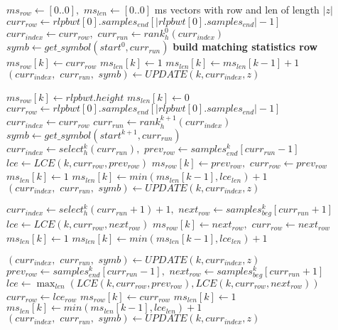 \documentclass[a4paper,12pt, oneside]{book}
\begin{document}
\begin{algorithm}
  \scriptsize
  \begin{algorithmic}[1]
    \State $ms_{row}\gets [0..0],\,\,ms_{len}\gets [0..0]$
    \Comment ms vectors with row and len of length $|z|$
    \State $curr_{row}\gets
    rlpbwt[0].samples_{end}[|rlpbwt[0].samples_{end}|-1]$
    \State $curr_{index}\gets curr_{row},\,\,curr_{run}\gets
    rank_h^0(curr_{index})$ 
    \State $symb\gets get\_symbol(start^0, curr_{run})$
    \Comment \textbf{build matching statistics row}
    \For {\textit{every} $k\in[0, |z|)$}
    \State $ms_{row}[k]\gets curr_{row}$
    \State $ms_{len}[k] \gets 1$
    \Else
    \State $ms_{len}[k] \gets ms_{len}[k-1]+1$
    \EndIf
     \State $(curr_{index},\,\,curr_{run},\,\,symb)\gets UPDATE(k, curr_{index},
    z)$ 
    \EndIf
    \Else
    
    \State $ms_{row}[k]\gets rlpbwt.height$
    \State $ms_{len}[k]\gets 0$
    \State $curr_{row}\gets
    rlpbwt[0].samples_{end}[|rlpbwt[0].samples_{end}|-1]$
    \State $curr_{index}\gets curr_{row}$
    \State $curr_{run}\gets rank_h^{k+1}(curr_{index})$
    \State $symb\gets get\_symbol(start^{k+1}, curr_{run})$
    \EndIf
    \Else
    \State $curr_{index}\gets select_h^k(curr_{run}),\,\,prev_{row}\gets
    samples_{end}^k[curr_{run}-1]$ 
    \State $lce\gets LCE(k, curr_{row}, prev_{row})$
    \State $ms_{row}[k]\gets prev_{row},\,\,curr_{row}\gets prev_{row}$
    \State $ms_{len}[k] \gets 1$
    \Else
    \State $ms_{len}[k] \gets min(ms_{len}[k-1], lce_{len})+1$
    \EndIf
    \State $(curr_{index},\,\,curr_{run},\,\,symb)\gets UPDATE(k, curr_{index},
    z)$  
    \EndIf
    
    \State $curr_{index}\gets select_h^k(curr_{run}+1)+1,\,\,next_{row}\gets
    samples_{beg}^k[curr_{run}+1]$ 
    \State $lce\gets LCE(k, curr_{row}, next_{row})$
    \State $ms_{row}[k]\gets next_{row},\,\,curr_{row}\gets next_{row}$
    \State $ms_{len}[k] \gets 1$
    \Else
    \State $ms_{len}[k] \gets min(ms_{len}[k-1], lce_{len})+1$
    \EndIf
  
    \State $(curr_{index},\,\,curr_{run},\,\,symb)\gets UPDATE(k, curr_{index},
    z)$ 
    \EndIf
    \Else
    \State $prev_{row}\gets samples_{end}^k[curr_{run}-1],\,\,next_{row}\gets
    samples_{beg}^k[curr_{run}+1]$ 
    \State $lce\gets \max_{len} (LCE(k, curr_{row}, prev_{row}), LCE(k,
    curr_{row}, next_{row}))$
    \State $curr_{row}\gets lce_{row}$
    \State $ms_{row}[k]\gets curr_{row}$
    \State $ms_{len}[k] \gets 1$
    \Else
    \State $ms_{len}[k] \gets min(ms_{len}[k-1], lce_{len})+1$
    \EndIf
    \State $(curr_{index},\,\,curr_{run},\,\,symb)\gets UPDATE(k, curr_{index},
    z)$ 
    \EndIf
    \EndIf
    \EndIf
    \EndIf
    \EndFor
    

\end{algorithmic}
\end{algorithm}
\end{document}
